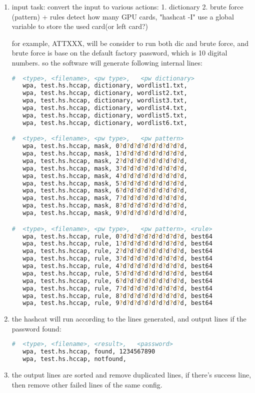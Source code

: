\begin{enumerate}
  \item input task:
  convert the input to various actions:
 1. dictionary
 2. brute force (pattern) + rules
 detect how many GPU cards, "hashcat -I"
 use a global variable to store the used card(or left card?)

 for example, ATTXXX, will be consider to run both dic and brute force,
 and brute force is base on the default factory password, which is 10 digital numbers.
 so the software will generate following internal lines:

\begin{lstlisting}[language=bash]
#  <type>, <filename>, <pw type>,   <pw dictionary>
   wpa, test.hs.hccap, dictionary, wordlist1.txt,
   wpa, test.hs.hccap, dictionary, wordlist2.txt,
   wpa, test.hs.hccap, dictionary, wordlist3.txt,
   wpa, test.hs.hccap, dictionary, wordlist4.txt,
   wpa, test.hs.hccap, dictionary, wordlist5.txt,
   wpa, test.hs.hccap, dictionary, wordlist6.txt,

#  <type>, <filename>, <pw type>,   <pw pattern>
   wpa, test.hs.hccap, mask, 0?d?d?d?d?d?d?d?d?d,
   wpa, test.hs.hccap, mask, 1?d?d?d?d?d?d?d?d?d,
   wpa, test.hs.hccap, mask, 2?d?d?d?d?d?d?d?d?d,
   wpa, test.hs.hccap, mask, 3?d?d?d?d?d?d?d?d?d,
   wpa, test.hs.hccap, mask, 4?d?d?d?d?d?d?d?d?d,
   wpa, test.hs.hccap, mask, 5?d?d?d?d?d?d?d?d?d,
   wpa, test.hs.hccap, mask, 6?d?d?d?d?d?d?d?d?d,
   wpa, test.hs.hccap, mask, 7?d?d?d?d?d?d?d?d?d,
   wpa, test.hs.hccap, mask, 8?d?d?d?d?d?d?d?d?d,
   wpa, test.hs.hccap, mask, 9?d?d?d?d?d?d?d?d?d,

#  <type>, <filename>, <pw type>,   <pw pattern>, <rule>
   wpa, test.hs.hccap, rule, 0?d?d?d?d?d?d?d?d?d, best64
   wpa, test.hs.hccap, rule, 1?d?d?d?d?d?d?d?d?d, best64
   wpa, test.hs.hccap, rule, 2?d?d?d?d?d?d?d?d?d, best64
   wpa, test.hs.hccap, rule, 3?d?d?d?d?d?d?d?d?d, best64
   wpa, test.hs.hccap, rule, 4?d?d?d?d?d?d?d?d?d, best64
   wpa, test.hs.hccap, rule, 5?d?d?d?d?d?d?d?d?d, best64
   wpa, test.hs.hccap, rule, 6?d?d?d?d?d?d?d?d?d, best64
   wpa, test.hs.hccap, rule, 7?d?d?d?d?d?d?d?d?d, best64
   wpa, test.hs.hccap, rule, 8?d?d?d?d?d?d?d?d?d, best64
   wpa, test.hs.hccap, rule, 9?d?d?d?d?d?d?d?d?d, best64
\end{lstlisting}

  \item the hashcat will run according to the lines generated,
and output lines if the password found:
\begin{lstlisting}[language=bash]
#  <type>, <filename>, <result>,   <password>
   wpa, test.hs.hccap, found, 1234567890
   wpa, test.hs.hccap, notfound,
\end{lstlisting}

  \item the output lines are sorted and remove duplicated lines,
if there's success line, then remove other failed lines of the same config.

\end{enumerate}


